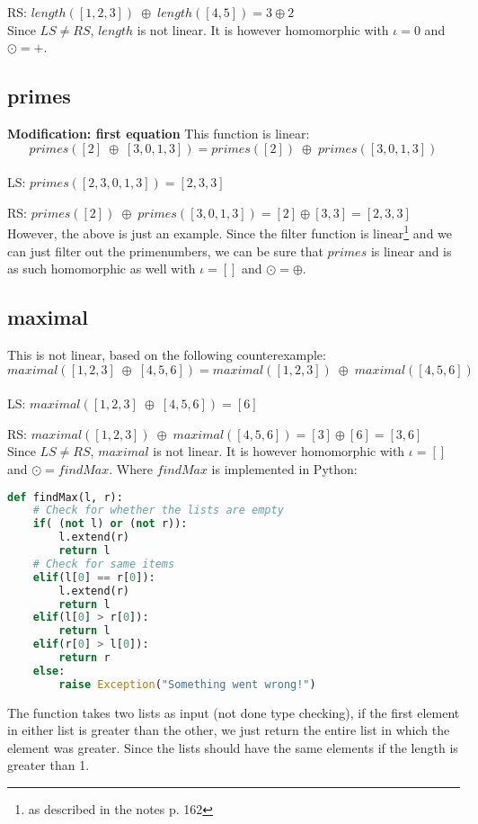 RS: \tab
$
length( [1,2,3]) \; \oplus \; length( [4,5] ) = 3 \oplus 2
$
\\

Since $LS \neq RS$, $length$ is not linear. It is however homomorphic with $\iota = 0$ and $\odot = +$.

\subsection*{primes}
\textbf{Modification: first equation}
This function is linear:
$$
  primes( [2] \; \oplus \; [3,0,1,3]) = primes( [2]) \; \oplus \; primes( [3,0,1,3] )
$$
\\
LS: \tab
$
primes( [2,3,0,1,3]) = [2,3,3]
$

RS: \tab
$
primes( [2]) \; \oplus \; primes( [3,0,1,3] ) = [2] \oplus [3,3] = [2,3,3]
$
\\

However, the above is just an example. Since the filter function is linear\footnote{as described in the notes p. 162} and we can just filter out the primenumbers, we can be sure that $primes$ is linear and is as such homomorphic as well with $\iota = []$ and $\odot = \oplus$.

\subsection*{maximal}
This is not linear, based on the following counterexample:
$$
  maximal( [1,2,3] \; \oplus \; [4,5,6]) = maximal([1,2,3]) \; \oplus \; maximal([4,5,6])
$$
\\
LS: \tab
$
maximal( [1,2,3] \; \oplus \; [4,5,6]) = [6]
$

RS: \tab
$
maximal([1,2,3]) \; \oplus \; maximal([4,5,6]) = [3] \oplus [6] = [3,6]
$
\\

Since $LS \neq RS$, $maximal$ is not linear. It is however homomorphic with $\iota = []$ and $\odot = findMax $. Where $findMax$ is implemented in Python:
\begin{lstlisting}[language=Python]
def findMax(l, r):
    # Check for whether the lists are empty
    if( (not l) or (not r)):
        l.extend(r)
        return l
    # Check for same items
    elif(l[0] == r[0]):
        l.extend(r)
        return l
    elif(l[0] > r[0]):
        return l
    elif(r[0] > l[0]):
        return r
    else:
        raise Exception("Something went wrong!")
\end{lstlisting}
The function takes two lists as input (not done type checking), if the first element in either list is greater than the other, we just return the entire list in which the element was greater. Since the lists should have the same elements if the length is greater than 1.

